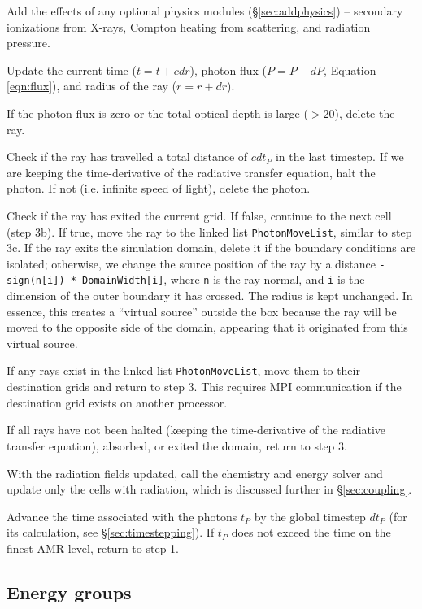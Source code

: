\documentclass[useAMS,usenatbib]{mn2e}
\begin{document}
 Add the effects of any optional physics modules
(\S\ref{sec:addphysics}) -- secondary ionizations from X-rays, Compton
heating from scattering, and radiation pressure.

 Update the current time ($t = t + cdr$), photon flux ($P = P
- dP$, Equation \ref{eqn:flux}), and radius of the ray ($r = r + dr$).

 If the photon flux is zero or the total optical depth is
large ($>20$), delete the ray.

 Check if the ray has travelled a total distance of $c dt_P$
in the last timestep.  If we are keeping the time-derivative of the
radiative transfer equation, halt the photon.  If not (i.e. infinite
speed of light), delete the photon.

 Check if the ray has exited the current grid.  If false,
continue to the next cell (step 3b).  If true, move the ray to the
linked list \texttt{PhotonMoveList}, similar to step 3c.  If the ray
exits the simulation domain, delete it if the boundary conditions are
isolated; otherwise, we change the source position of the ray by a
distance \texttt{-sign(n[i]) * DomainWidth[i]}, where \texttt{n} is
the ray normal, and \texttt{i} is the dimension of the outer boundary
it has crossed.  The radius is kept unchanged.  In essence, this
creates a ``virtual source'' outside the box because the ray will be
moved to the opposite side of the domain, appearing that it originated
from this virtual source.

 If any rays exist in the linked list \texttt{PhotonMoveList},
move them to their destination grids and return to step 3.  This
requires MPI communication if the destination grid exists on another
processor.

 If all rays have not been halted (keeping the time-derivative
of the radiative transfer equation), absorbed, or exited the domain,
return to step 3.

 With the radiation fields updated, call the chemistry and
energy solver and update only the cells with radiation, which is
discussed further in \S\ref{sec:coupling}.

 Advance the time associated with the photons $t_P$ by the
global timestep $dt_P$ (for its calculation, see
\S\ref{sec:timestepping}).  If $t_P$ does not exceed the time on the
finest AMR level, return to step 1.

\subsection{Energy groups}
\end{document}
